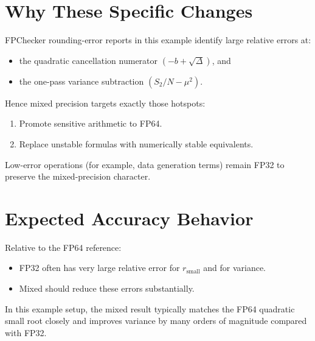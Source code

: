 \documentclass[11pt]{article}
\begin{document}
\section{Why These Specific Changes}
FPChecker rounding-error reports in this example identify large relative errors at:
\begin{itemize}
  \item the quadratic cancellation numerator \((-b+\sqrt{\Delta})\), and
  \item the one-pass variance subtraction \((S_2/N - \mu^2)\).
\end{itemize}

Hence mixed precision targets exactly those hotspots:
\begin{enumerate}
  \item Promote sensitive arithmetic to FP64.
  \item Replace unstable formulas with numerically stable equivalents.
\end{enumerate}

Low-error operations (for example, data generation terms) remain FP32 to preserve the mixed-precision character.

\section{Expected Accuracy Behavior}
Relative to the FP64 reference:
\begin{itemize}
  \item FP32 often has very large relative error for \(r_{\text{small}}\) and for variance.
  \item Mixed should reduce these errors substantially.
\end{itemize}

In this example setup, the mixed result typically matches the FP64 quadratic small root closely 
and improves variance by many orders of magnitude compared with FP32.
\end{document}
